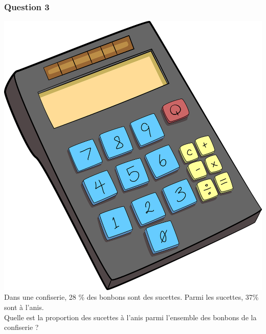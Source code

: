 \documentclass[15pt, mathserif]{beamer}
\begin{document}
\begin{frame} 
	\frametitle{Question 3}
\includegraphics[scale=0.01]{calculatrice} Dans une confiserie, 28 \% des bonbons sont des sucettes. Parmi les sucettes, 37\% sont à l'anis. \\ Quelle est la proportion des sucettes à l'anis parmi l'ensemble des bonbons de la confiserie ?\end{frame}
\end{document}
